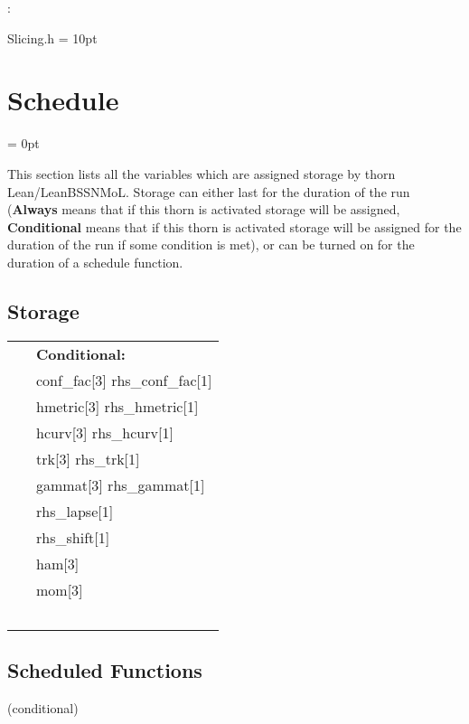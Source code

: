 \vspace{5mm}

: 

Slicing.h
\vspace{2mm}\parskip = 10pt 

\section{Schedule} 


\parskip = 0pt


\noindent This section lists all the variables which are assigned storage by thorn Lean/LeanBSSNMoL.  Storage can either last for the duration of the run ({\bf Always} means that if this thorn is activated storage will be assigned, {\bf Conditional} means that if this thorn is activated storage will be assigned for the duration of the run if some condition is met), or can be turned on for the duration of a schedule function.


\subsection*{Storage}

\hspace{5mm}

 \begin{tabular*}{160mm}{ll} 
~& {\bf Conditional:} \\ 
~ &  conf\_fac[3] rhs\_conf\_fac[1]\\ 
~ &  hmetric[3] rhs\_hmetric[1]\\ 
~ &  hcurv[3] rhs\_hcurv[1]\\ 
~ &  trk[3] rhs\_trk[1]\\ 
~ &  gammat[3] rhs\_gammat[1]\\ 
~ &  rhs\_lapse[1]\\ 
~ &  rhs\_shift[1]\\ 
~ &  ham[3]\\ 
~ &  mom[3]\\ 
~ & ~\\ 
\end{tabular*} 


\subsection*{Scheduled Functions}
\vspace{5mm}

   (conditional) 


